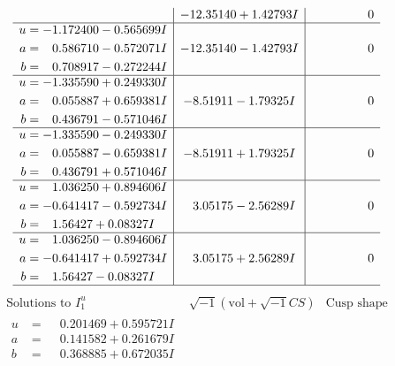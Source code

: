 \documentclass[1p]{elsarticle_modified}
\theoremstyle{definition}
\newcommand{\I}{\sqrt{-1}}
\begin{document}
$$\begin{array}{c|c|c}
 & -12.35140 + 1.42793 I & \phantom{-0.000000 } 0 \\ \hline\begin{aligned}
u &= -1.172400 - 0.565699 I \\
a &= \phantom{-}0.586710 - 0.572071 I \\
b &= \phantom{-}0.708917 - 0.272244 I\end{aligned}
 & -12.35140 - 1.42793 I & \phantom{-0.000000 } 0 \\ \hline\begin{aligned}
u &= -1.335590 + 0.249330 I \\
a &= \phantom{-}0.055887 + 0.659381 I \\
b &= \phantom{-}0.436791 - 0.571046 I\end{aligned}
 & -8.51911 - 1.79325 I & \phantom{-0.000000 } 0 \\ \hline\begin{aligned}
u &= -1.335590 - 0.249330 I \\
a &= \phantom{-}0.055887 - 0.659381 I \\
b &= \phantom{-}0.436791 + 0.571046 I\end{aligned}
 & -8.51911 + 1.79325 I & \phantom{-0.000000 } 0 \\ \hline\begin{aligned}
u &= \phantom{-}1.036250 + 0.894606 I \\
a &= -0.641417 - 0.592734 I \\
b &= \phantom{-}1.56427 + 0.08327 I\end{aligned}
 & \phantom{-}3.05175 - 2.56289 I & \phantom{-0.000000 } 0 \\ \hline\begin{aligned}
u &= \phantom{-}1.036250 - 0.894606 I \\
a &= -0.641417 + 0.592734 I \\
b &= \phantom{-}1.56427 - 0.08327 I\end{aligned}
 & \phantom{-}3.05175 + 2.56289 I & \phantom{-0.000000 } 0\\
 \hline 
 \end{array}$$\newpage$$\begin{array}{c|c|c}  
\text{Solutions to }I^u_{1}& \I (\text{vol} + \sqrt{-1}CS) & \text{Cusp shape}\\
 \hline 
\begin{aligned}
u &= \phantom{-}0.201469 + 0.595721 I \\
a &= \phantom{-}0.141582 + 0.261679 I \\
b &= \phantom{-}0.368885 + 0.672035 I\end{aligned}

\end{array}$$
\end{document}
